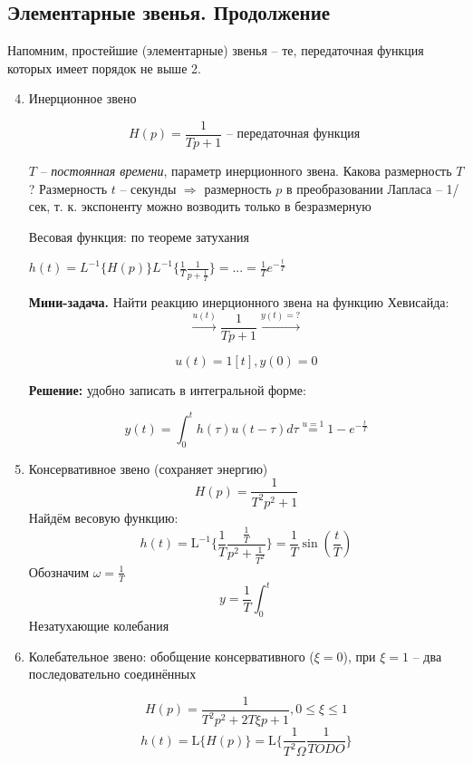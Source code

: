 \documentclass[main.tex]{subfiles}
\begin{document}
\subsection{Элементарные звенья. Продолжение}

Напомним, простейшие (элементарные) звенья -- те, передаточная функция которых имеет порядок не выше 2.

\begin{enumerate}[noitemsep]
    \setcounter{enumi}{3} %
    \item Инерционное звено

    $$ H(p) = \frac{1}{Tp + 1} \text{ -- передаточная функция } $$

    $ T $ -- \emph{постоянная времени}, параметр инерционного звена.
    Какова размерность $T$?
    Размерность $t$ -- секунды $\Rightarrow$ размерность $p$ в преобразовании Лапласа -- 1/сек, т. к. экспоненту можно возводить только в безразмерную

    Весовая функция: по теореме затухания

    $ h(t) = L^{-1}\{H(p)\} L^{-1}\{\frac{1}{T} \frac{1}{p + \frac{1}{T}}\} = ... = \frac{1}{T}e^{-\frac{t}{T}} $

    \textbf{Мини-задача.} Найти реакцию инерционного звена на функцию Хевисайда:
    $$ \xrightarrow{u(t)} \boxed{\frac{1}{Tp+1}} \xrightarrow{y(t)=?} $$

    $$ u(t) = 1[t], y(0) = 0 $$

    \textbf{Решение:} удобно записать в интегральной форме:

    $$ y(t) = \int_0^t h(\tau) u(t-\tau) d\tau \overset{u = 1}= 1 - e^{-\frac{t}{T}} $$

    \item Консервативное звено (сохраняет энергию)
    $$ H(p) = \frac{1}{T^2p^2 + 1} $$
    Найдём весовую функцию:
    $$ h(t) = \mathrm{L}^{-1}\{\frac{1}{T} \frac{\frac{1}{T}}{p^2 + \frac{1}{T^2}}\} = \frac{1}{T} \sin(\frac{t}{T}) $$
    Обозначим $ \omega = \frac{1}{T} $
    $$ y = \frac{1}{T} \int_0^t $$ %
    Незатухающие колебания

    \item Колебательное звено: обобщение консервативного ($\xi = 0$), при $\xi=1$ -- два последовательно соединённых %

    $$ H(p) = \frac{1}{T^2p^2 + 2 T \xi p + 1}, 0 \le \xi \le 1 $$
    $$ h(t) = \mathrm{L}\{H(p)\} = \mathrm{L}\{\frac{1}{T^2 \Omega} \frac{1}{TODO}\} $$ %


\end{enumerate}
\end{document}
